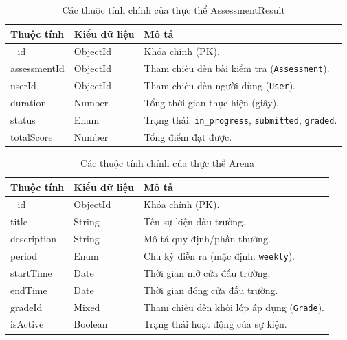 \begin{table}[H]
	\centering
	\begin{tabularx}{\textwidth}{|l|l|X|}
		\hline
		\textbf{Thuộc tính} & \textbf{Kiểu dữ liệu} & \textbf{Mô tả} \\ \hline
		\_id & ObjectId & Khóa chính (PK). \\ \hline
		assessmentId & ObjectId & Tham chiếu đến bài kiểm tra (\texttt{Assessment}). \\ \hline
		userId & ObjectId & Tham chiếu đến người dùng (\texttt{User}). \\ \hline
		duration & Number & Tổng thời gian thực hiện (giây). \\ \hline
		status & Enum & Trạng thái: \texttt{in\_progress}, \texttt{submitted}, \texttt{graded}. \\ \hline
		totalScore & Number & Tổng điểm đạt được. \\ \hline
	\end{tabularx}
	\caption{Các thuộc tính chính của thực thể AssessmentResult}
\end{table}

\begin{table}[H]
	\centering
	\begin{tabularx}{\textwidth}{|l|l|X|}
		\hline
		\textbf{Thuộc tính} & \textbf{Kiểu dữ liệu} & \textbf{Mô tả} \\ \hline
		\_id & ObjectId & Khóa chính (PK). \\ \hline
		title & String & Tên sự kiện đấu trường. \\ \hline
		description & String & Mô tả quy định/phần thưởng. \\ \hline
		period & Enum & Chu kỳ diễn ra (mặc định: \texttt{weekly}). \\ \hline
		startTime & Date & Thời gian mở cửa đấu trường. \\ \hline
		endTime & Date & Thời gian đóng cửa đấu trường. \\ \hline
		gradeId & Mixed & Tham chiếu đến khối lớp áp dụng (\texttt{Grade}). \\ \hline
		isActive & Boolean & Trạng thái hoạt động của sự kiện. \\ \hline
	\end{tabularx}
	\caption{Các thuộc tính chính của thực thể Arena}
\end{table}

